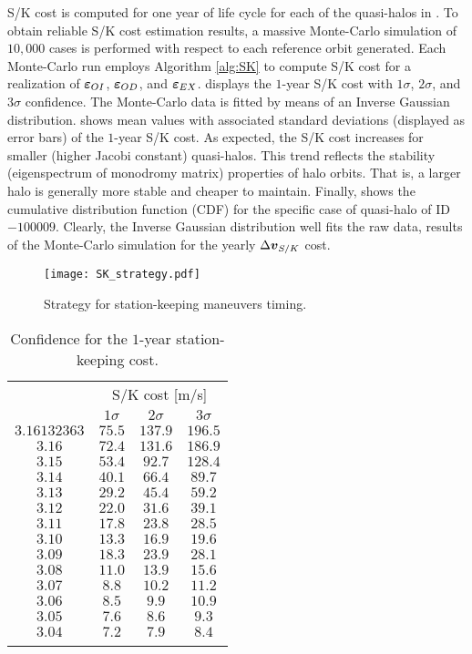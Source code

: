 S/K cost is computed for one year of life cycle for each of the quasi-halos in . To obtain reliable S/K cost estimation results, a massive Monte-Carlo simulation of $10,000$ cases is performed with respect to each reference orbit generated. Each Monte-Carlo run employs Algorithm \ref{alg:SK} to compute S/K cost for a realization of $\boldsymbol{\varepsilon}_{OI}$, $\boldsymbol{\varepsilon}_{OD}$, and $\boldsymbol{\varepsilon}_{EX}$.  displays the $1$-year S/K cost with $1\sigma$, $2\sigma$, and $3\sigma$ confidence. The Monte-Carlo data is fitted by means of an Inverse Gaussian distribution.  shows mean values with associated standard deviations (displayed as error bars) of the $1$-year S/K cost. As expected, the S/K cost increases for smaller (\ie higher Jacobi constant) quasi-halos. This trend reflects the stability (eigenspectrum of monodromy matrix) properties of halo orbits. That is, a larger halo is generally more stable and cheaper to maintain. Finally,  shows the cumulative distribution function (CDF) for the specific case of quasi-halo of ID $-100009$. Clearly, the Inverse Gaussian distribution well fits the raw data, results of the Monte-Carlo simulation for the yearly $\Delta\boldsymbol{v}_{S/K}$ cost.
%
\begin{figure*}[]
	\centering
	\texttt{[image: SK\_strategy.pdf]}
	\caption{Strategy for station-keeping maneuvers timing.}
	\label{fig:SK_strategy}
\end{figure*}
%
%
\begin{table}[]
	\caption{Confidence for the $1$-year station-keeping cost.}
	\label{tab:SKconfidence}
	\centering
	\footnotesize
	\begin{tabular}{cccc}
		\TOPlines
		\multirow{2}{*}{$C_j$ [adim]} & \multicolumn{3}{c}{S/K cost [m/s]} \\
		& $1\sigma$ & $2\sigma$ & $3\sigma$ \\
		\MIDline
		$3.16132363$ & $75.5$ & $137.9$ & $196.5$ \\
		$3.16$ & $72.4$ & $131.6$ & $186.9$ \\
		$3.15$ & $53.4$ & $92.7$ & $128.4$ \\
		$3.14$ & $40.1$ & $66.4$ & $89.7$ \\
		$3.13$ & $29.2$ & $45.4$ & $59.2$ \\
		$3.12$ & $22.0$ & $31.6$ & $39.1$ \\
		$3.11$ & $17.8$ & $23.8$ & $28.5$ \\
		$3.10$ & $13.3$ & $16.9$ & $19.6$ \\
		$3.09$ & $18.3$ & $23.9$ & $28.1$ \\
		$3.08$ & $11.0$ & $13.9$ & $15.6$ \\
		$3.07$ & $8.8$ & $10.2$ & $11.2$ \\
		$3.06$ & $8.5$ & $9.9$ & $10.9$ \\
		$3.05$ & $7.6$ & $8.6$ & $9.3$ \\
		$3.04$ & $7.2$ & $7.9$ & $8.4$ \\
		\BOTTOMlines
	\end{tabular}
\end{table}
